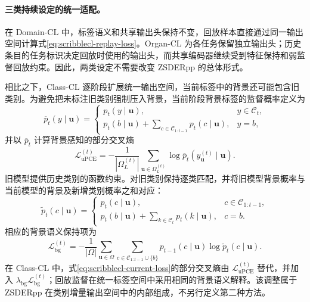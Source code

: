 \paragraph{三类持续设定的统一适配。}
在 Domain-CL 中，标签语义和共享输出头保持不变，回放样本直接通过同一输出空间计算式\eqref{eq:scribblecl-replay-loss}。Organ-CL 为各任务保留独立输出头；历史条目的任务标识决定回放时使用的输出头，而共享编码器继续受到特征保持和弱监督回放约束。因此，两类设定不需要改变 ZSDERpp 的总体形式。

相比之下，Class-CL 逐阶段扩展统一输出空间，当前标签中的背景还可能包含旧类别。为避免把未标注旧类别强制压入背景，当前阶段背景标签的监督概率定义为\cite{cermelli2020mib}
\begin{equation}
\overline{p}_{t}(y\mid\mathbf{u})
=
\begin{cases}
p_t(y\mid\mathbf{u}), & y\in\mathcal{C}_t,\\[1mm]
p_t(b\mid\mathbf{u})+
\displaystyle\sum_{c\in\mathcal{C}_{1:t-1}}p_t(c\mid\mathbf{u}), & y=b,
\end{cases}
\label{eq:scribblecl-background-aware-probability}
\end{equation}
并以 $\overline p_t$ 计算背景感知的部分交叉熵
\begin{equation}
\mathcal{L}_{\mathrm{uPCE}}^{(t)}
=
-\frac{1}{|\Omega_L^{(t)}|}
\sum_{\mathbf{u}\in\Omega_L^{(t)}}
\log \overline p_t\!\left(y_{\mathbf{u}}^{(t)}\mid\mathbf{u}\right).
\label{eq:scribblecl-background-aware-pce}
\end{equation}
旧模型提供历史类别的函数约束。对旧类别保持逐类匹配，并将旧模型背景概率与当前模型的背景及新增类别概率之和对应：
\begin{equation}
\widetilde p_t(c\mid\mathbf{u})
=
\begin{cases}
p_t(c\mid\mathbf{u}), & c\in\mathcal{C}_{1:t-1},\\[1mm]
p_t(b\mid\mathbf{u})+
\displaystyle\sum_{k\in\mathcal{C}_t}p_t(k\mid\mathbf{u}), & c=b.
\end{cases}
\label{eq:scribblecl-background-aware-distillation-probability}
\end{equation}
相应的背景语义保持项为
\begin{equation}
\mathcal{L}_{\mathrm{bg}}^{(t)}
=
-\frac{1}{|\Omega|}
\sum_{\mathbf{u}\in\Omega}
\sum_{c\in\mathcal{C}_{1:t-1}\cup\{b\}}
p_{t-1}(c\mid\mathbf{u})
\log \widetilde p_t(c\mid\mathbf{u}).
\label{eq:scribblecl-background-aware-distillation}
\end{equation}
在 Class-CL 中，式\eqref{eq:scribblecl-current-loss}的部分交叉熵由 $\mathcal{L}_{\mathrm{uPCE}}^{(t)}$ 替代，并加入 $\lambda_{\mathrm{bg}}\mathcal{L}_{\mathrm{bg}}^{(t)}$；回放监督在统一标签空间中采用相同的背景语义解释。该调整属于 ZSDERpp 在类别增量输出空间中的内部组成，不另行定义第二种方法。

